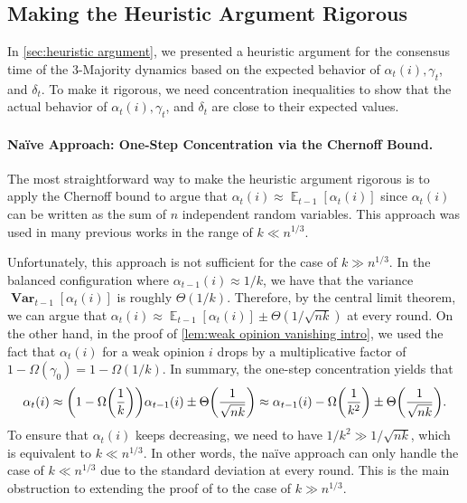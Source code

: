 \documentclass[letterpaper,11pt]{article}
\DeclareMathOperator*{\E}{\mathbb{E}}
\DeclareMathOperator*{\Var}{\mathbf{Var}}
\newcommand{\alphanorm}{\gamma}
\begin{document}
\subsection{Making the Heuristic Argument Rigorous} \label{sec:make rigorous}
In \cref{sec:heuristic argument}, we presented a heuristic argument for the consensus time of the 3-Majority dynamics based on the expected behavior of $\alpha_t(i),\alphanorm_t$, and $\delta_t$.
To make it rigorous, we need concentration inequalities to show that the actual behavior of $\alpha_t(i), \alphanorm_t$, and $\delta_t$ are close to their expected values.

\paragraph*{Na\"ive Approach: One-Step Concentration via the Chernoff Bound.}
The most straightforward way to make the heuristic argument rigorous is to apply the Chernoff bound to argue that $\alpha_t(i) \approx \E_{t-1}[\alpha_t(i)]$ since $\alpha_t(i)$ can be written as the sum of $n$ independent random variables.
This approach was used in many previous works \cite{simple_dynamics,stabilizing_consensus,nearly_tight_analysis} in the range of $k \ll n^{1/3}$.

Unfortunately, this approach is not sufficient for the case of $k \gg n^{1/3}$.
In the balanced configuration where $\alpha_{t-1}(i) \approx 1/k$, we have that the variance $\Var_{t-1}[\alpha_t(i)]$ is roughly $\Theta(1/k)$.
Therefore, by the central limit theorem, we can argue that $\alpha_t(i) \approx \E_{t-1}[\alpha_t(i)] \pm \Theta(1/\sqrt{nk})$ at every round.
On the other hand, in the proof of \cref{lem:weak opinion vanishing intro}, we used the fact that $\alpha_t(i)$ for a weak opinion $i$ drops by a multiplicative factor of $1-\Omega(\alphanorm_0) = 1-\Omega(1/k)$.
In summary, the one-step concentration yields that 
\begin{align*}
  \alpha_t(i) \approx \qty(1-\Omega\qty(\frac{1}{k}))\alpha_{t-1}(i) \pm \Theta\qty(\frac{1}{\sqrt{nk}}) \approx \alpha_{t-1}(i) - \Omega\qty(\frac{1}{k^2}) \pm \Theta\qty(\frac{1}{\sqrt{nk}}).
\end{align*}
To ensure that $\alpha_t(i)$ keeps decreasing, we need to have $1/k^2 \gg 1/\sqrt{nk}$, which is equivalent to $k \ll n^{1/3}$.
In other words, the na\"ive approach can only handle the case of $k \ll n^{1/3}$ due to the standard deviation at every round.
This is the main obstruction to extending the proof of \cite{nearly_tight_analysis} to the case of $k \gg n^{1/3}$.
\end{document}
